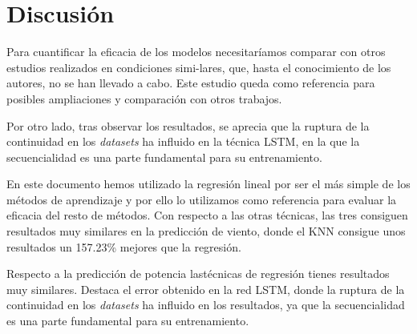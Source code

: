 \documentclass[journal]{IEEEtran}
\begin{document}
%

\section{Discusión}
Para cuantificar  la eficacia de los modelos necesitaríamos comparar con otros estudios realizados en condiciones simi-lares, que, hasta el conocimiento de los autores, no se han llevado a cabo. Este estudio queda como referencia para posibles ampliaciones y comparación con otros trabajos.

Por otro lado, tras observar los resultados, se aprecia que la ruptura de la continuidad en los \emph{datasets} ha influido en la técnica LSTM, en la que la secuencialidad es una parte fundamental para su entrenamiento. 

En este documento hemos utilizado la regresión lineal por ser el más simple de los métodos de aprendizaje y por ello lo utilizamos como referencia para evaluar la eficacia del resto de métodos.
Con respecto a las otras técnicas, las tres consiguen resultados muy similares en la predicción de viento, donde el KNN consigue unos resultados un 157.23\% mejores que la regresión.

Respecto a la predicción de potencia lastécnicas de regresión tienes resultados muy similares. Destaca el error obtenido en la red LSTM, donde la ruptura de la continuidad en los \emph{datasets} ha influido en los resultados, ya que la secuencialidad es una parte fundamental para su entrenamiento. 
\end{document}
